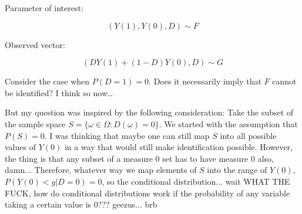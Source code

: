 \documentclass[a4paper,12pt,twoside]{article}
\begin{document}
Parameter of interest:

\begin{equation}
	(Y(1), Y(0), D) \sim F
\end{equation}

Observed vector:

\begin{equation}
	(D Y(1) + (1 - D) Y(0), D) \sim G
\end{equation}

Consider the case when $P(D = 1) = 0$. Does it necessarily imply that $F$ cannot be identified? I think so now\dots

But my question was inspired by the following consideration: Take the subset of the sample space $S = \{ \omega \in \Omega : D(\omega) = 0\}$. We started with the assumption that $P(S) = 0$. I was thinking that maybe one can still map $S$ into all possible values of $Y(0)$ in a way that would still make identification possible. However, the thing is that any subset of a measure $0$ set has to have measure $0$ also, damn... Therefore, whatever way we map elements of $S$ into the range of $Y(0)$, $P(Y(0) < y | D = 0) = 0$, so the conditional distribution... wait WHAT THE FUCK, how do conditional distributions work if the probability of any variable taking a certain value is $0$??? geezus... brb
\end{document}
